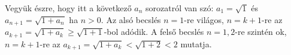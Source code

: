    Vegyük észre, hogy itt a következő $a_{n}$ sorozatról van szó:
   $a_{1}=\sqrt{1}$ és $a_{n+1}=\sqrt{1+a_{n}}$ ha $n>0$. Az alsó becslés $n=1$-re
   világos, $n=k+1$-re az $a_{k+1}=\sqrt{1+a_{k}}\ge\sqrt{1+1}$-bol adódik. A felső becslés 
   $n=1,2$-re szintén ok, $n=k+1$-re az $a_{k+1}=\sqrt{1+a_{k}}<\sqrt{1+2}<2$ mutatja.

